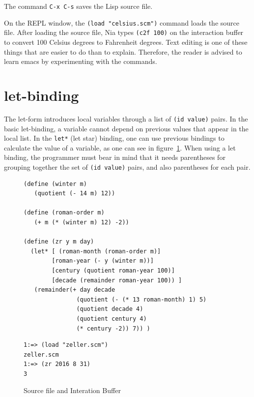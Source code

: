 \documentclass[a4paper,12pt]{book}
\newenvironment{fmpage}[1]
           {\begin{lrbox}{\fmbox}\begin{minipage}{#1}}
           {\end{minipage}\end{lrbox}\fbox{\usebox{\fmbox}}}
\begin{document}
The command \verb|C-x C-s| saves the Lisp source 
file. 

On the REPL window, the \verb|(load "celsius.scm")|
command loads the  source file.
After loading the source file, Nia types \verb|(c2f 100)|
on the interaction buffer to convert 100 Celsius degrees
to Fahrenheit degrees. Text editing is one of these things
that are easier to do than to explain. Therefore,
the reader is advised to learn emacs
by experimenting with the commands.

\section{let-binding}
The let-form introduces 
local variables
through a list of \verb|(id value)| 
pairs.
In the basic let-binding, a variable cannot 
depend on previous values that appear
in the local list. In the
\verb|let*| (let star) binding,
one can use previous bindings to calculate
the value of a variable, as one can see in
figure~\ref{fig:date-calculation}.
When using a let binding, the programmer must
bear in mind that it needs parentheses for
grouping together the set of \verb|(id value)| pairs,
and also parentheses for each pair.

\begin{figure}[!b]
\begin{fmpage}{0.9\linewidth}
\begin{verbatim}
(define (winter m)
   (quotient (- 14 m) 12))

(define (roman-order m)
   (+ m (* (winter m) 12) -2))

(define (zr y m day)
  (let* [ (roman-month (roman-order m)]
        [roman-year (- y (winter m))]
        [century (quotient roman-year 100)]
        [decade (remainder roman-year 100)) ]
   (remainder(+ day decade
               (quotient (- (* 13 roman-month) 1) 5)
               (quotient decade 4)
               (quotient century 4)
               (* century -2)) 7)) )

\end{verbatim}
\end{fmpage}

\begin{fmpage}{0.9\linewidth}
\begin{verbatim}
1:=> (load "zeller.scm")
zeller.scm
1:=> (zr 2016 8 31)
3
\end{verbatim}

\end{fmpage}
\caption{Source file and Interation Buffer}
\label{fig:date-calculation}
\end{figure}
\end{document}
